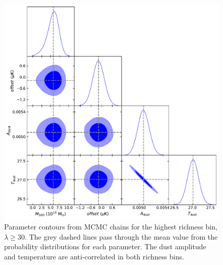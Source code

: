 \documentclass[a4paper,fleqn,usenatbib]{mnras}
\begin{document}
\begin{figure}
  \centering
  \includegraphics[width= \columnwidth] {corner_0180808_nw_12_ns_10000_mbat_tophat_11_arcmin_zbin01_rbin2_cut_1000.pdf}
  \caption{Parameter contours from MCMC chains for the highest richness bin, $\lambda \geq 30$. The grey dashed lines pass through the mean value from the probability distributions for each parameter. The dust amplitude and temperature are anti-correlated in both richness bins.}  \label{fig:mcmccontours}
\end{figure}
\end{document}
